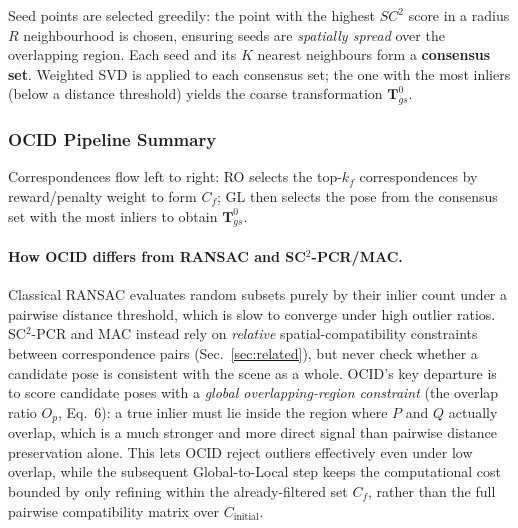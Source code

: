 \documentclass[11pt,a4paper]{article}
\begin{document}
Seed points are selected greedily: the point with the highest $SC^2$ score in a radius
$R$ neighbourhood is chosen, ensuring seeds are \emph{spatially spread} over the
overlapping region. Each seed and its $K$ nearest neighbours form a \textbf{consensus
set}. Weighted SVD is applied to each consensus set; the one with the most inliers
(below a distance threshold) yields the coarse transformation $\mathbf{T}_{gs}^0$.

\subsubsection{OCID Pipeline Summary}

\begin{center}
\end{center}
Correspondences flow left to right: RO selects the top-$k_f$ correspondences by
reward/penalty weight to form $C_f$; GL then selects the pose from the consensus set
with the most inliers to obtain $\mathbf{T}_{gs}^0$.

\paragraph{How OCID differs from RANSAC and SC$^2$-PCR/MAC.} Classical RANSAC evaluates
random subsets purely by their inlier count under a pairwise distance threshold, which is
slow to converge under high outlier ratios. SC$^2$-PCR and MAC instead rely on
\emph{relative} spatial-compatibility constraints between correspondence pairs
(Sec.~\ref{sec:related}), but never check whether a candidate pose is consistent with the
scene as a whole. OCID's key departure is to score candidate poses with a \emph{global
overlapping-region constraint} (the overlap ratio $O_p$, Eq.~6): a true inlier must lie
inside the region where $P$ and $Q$ actually overlap, which is a much stronger and more
direct signal than pairwise distance preservation alone. This lets OCID reject outliers
effectively even under low overlap, while the subsequent Global-to-Local step keeps the
computational cost bounded by only refining within the already-filtered set $C_f$, rather
than the full pairwise compatibility matrix over $C_{\text{initial}}$.
\end{document}
